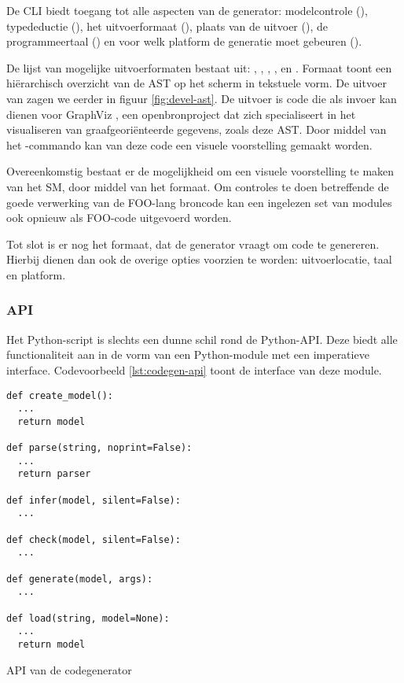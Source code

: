 De CLI biedt toegang tot alle aspecten van de generator: modelcontrole
(), typedeductie (), het uitvoerformaat (),
plaats van de uitvoer (), de programmeertaal () en
voor welk platform de generatie moet gebeuren ().

De lijst van mogelijke uitvoerformaten bestaat uit: , ,
, ,  en . Formaat  toont
een hi\"erarchisch overzicht van de AST op het scherm in tekstuele vorm. De
uitvoer van  zagen we eerder in figuur \ref{fig:devel-ast}. De
uitvoer is code die als invoer kan dienen voor GraphViz \citep{url:graphviz},
een openbronproject dat zich specialiseert in het visualiseren van
graafgeori\"enteerde gegevens, zoals deze AST. Door middel van het
-commando kan van deze code een visuele voorstelling gemaakt worden.

Overeenkomstig bestaat er de mogelijkheid om een visuele voorstelling te maken
van het SM, door middel van het  formaat. Om controles te doen
betreffende de goede verwerking van de FOO-lang broncode kan een ingelezen set
van modules ook opnieuw als FOO-code uitgevoerd worden.

Tot slot is er nog het  formaat, dat de generator vraagt om code te
genereren. Hierbij dienen dan ook de overige opties voorzien te worden:
uitvoerlocatie, taal en platform.

\subsubsection{API}

Het  Python-script is slechts een dunne schil rond de Python-API.
Deze biedt alle functionaliteit aan in de vorm van een Python-module met een
imperatieve interface. Codevoorbeeld \ref{lst:codegen-api} toont de interface
van deze module.

\begin{listing}[ht]
  \begin{verbatim}
def create_model():
  ...
  return model

def parse(string, noprint=False):
  ...
  return parser

def infer(model, silent=False):
  ...

def check(model, silent=False):
  ...

def generate(model, args):
  ...

def load(string, model=None):
  ...
  return model
  \end{verbatim}
  \vspace{-5mm}
  \caption{API van de codegenerator}
  \label{lst:codegen-api}
\end{listing}

